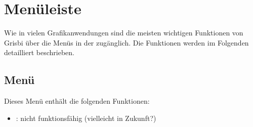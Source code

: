 \section{Menüleiste\label{home-menus}}

Wie in vielen Grafikanwendungen sind die meisten wichtigen Funktionen von Grisbi über die Menüs in der  zugänglich. Die Funktionen werden im Folgenden detailliert beschrieben.%


\subsection{Menü \label{home-menus-file}}

Dieses Menü enthält die folgenden Funktionen:%

\vspace{3mm}
\begin{itemize}[rightmargin=.6cm]
	\item {}: nicht funktionsfähig (vielleicht in Zukunft?)%
\end{itemize}

